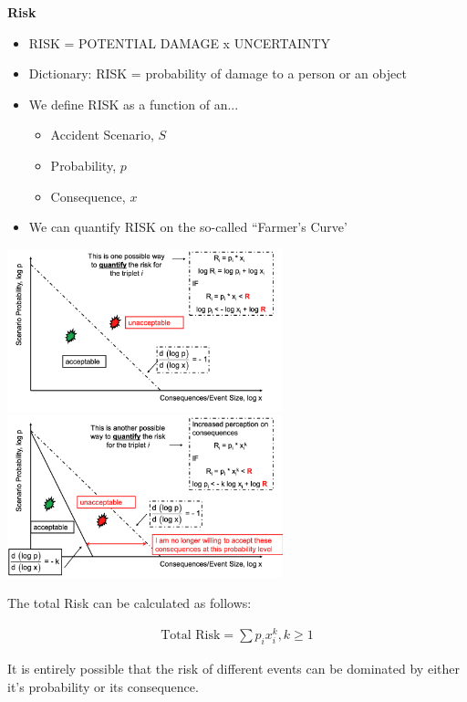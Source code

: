 \documentclass[8pt, landscape, fleqn]{scrartcl}
\begin{document}
\begin{multicols*}{3}
\textbf{Risk}

\begin{itemize}
    \item RISK = POTENTIAL DAMAGE x UNCERTAINTY
    \item Dictionary: RISK = probability of damage to a person or an object
    \item We define RISK as a function of an...
    \begin{itemize}
        \item Accident Scenario, $S$
        \item Probability, $p$
        \item Consequence, $x$
    \end{itemize}
    \item We can quantify RISK on the so-called ``Farmer's Curve'
\end{itemize}

\begin{center}
    \includegraphics[width=8cm]{Images/Farmer_I.png}
    \includegraphics[width=8cm]{Images/Farmer_II.png}
\end{center}

The total Risk can be calculated as follows:

\begin{align}
    \text{Total Risk} = \sum p_i x_i^k, k\geq 1
\end{align}

It is entirely possible that the risk of different events can be dominated by either it's probability or its consequence. 


\end{multicols*}
\end{document}
